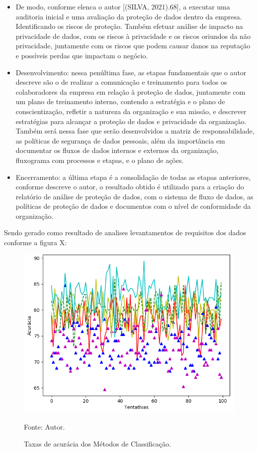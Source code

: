 \documentclass[
	12pt,				%
	openright,			%
	oneside,			%
	a4paper,			%
	english,			%
	french,				%
	spanish,			%
	brazil,				%
	]{abntex2}
\begin{document}
\begin{itemize}
\item De modo, conforme elenca o autor [(SILVA, 2021).68], a executar uma auditoria inicial e uma avaliação da proteção de dados dentro da empresa. Identificando os riscos de proteção. Também efetuar análise de impacto na privacidade de dados, com os riscos à privacidade e os riscos oriundos da não privacidade, juntamente com os riscos que podem causar danos na reputação e possíveis perdas que impactam o negócio.
\item Desenvolvimento: nessa penúltima fase, as etapas fundamentais que o autor descreve são o de realizar a comunicação e treinamento para todos os colaboradores da empresa em relação à proteção de dados, juntamente com um plano de treinamento interno, contendo a estratégia e o plano de conscientização, refletir a natureza da organização e sua missão, e descrever estratégias para alcançar a proteção de dados e privacidade da organização. Também será nessa fase que serão desenvolvidos a matriz de responsabilidade, as políticas de segurança de dados pessoais, além da importância em documentar os fluxos de dados internos e externos da organização, fluxograma com processos e etapas, e o plano de ações.
\item Encerramento: a última etapa é a consolidação de todas as etapas anteriores, conforme descreve o autor, o resultado obtido é utilizado para a criação do relatório de análise de proteção de dados, com o sistema de fluxo de dados, as políticas de proteção de dados e documentos com o nível de conformidade da organização.
\end{itemize}

Sendo gerado como resultado de analises levantamentos de requisitos dos dados conforme a figura X:

\begin{figure}[ht]
    \centering
    \caption{Taxas de acurácia dos Métodos de Classificação.}
    \includegraphics[width=5.0in]{Images/acc-classification.png}
    \label{fig: grafico-acc}
    
    \centering \small Fonte: Autor.
\end{figure}
\end{document}
